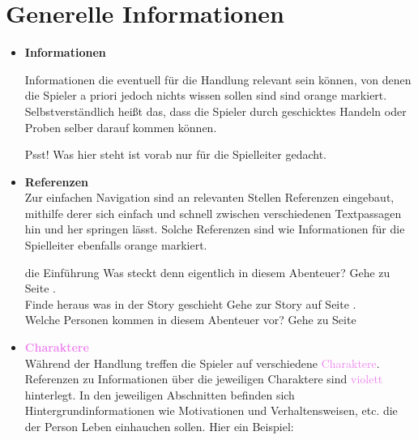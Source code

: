 
\thispagestyle{fancy-info}
\section*{Generelle Informationen}

\begin{itemize}
  \item \textcolor{OrangeBoxFrame}{\textbf{Informationen}}

  Informationen die eventuell für die Handlung relevant sein können, von denen die Spieler a priori jedoch nichts wissen sollen sind sind \textcolor{OrangeBoxFrame}{orange}
  markiert. Selbstverständlich heißt das, dass die Spieler durch geschicktes Handeln oder Proben selber darauf kommen können.

  \begin{info-box}

  Psst! Was hier steht ist vorab nur für die Spielleiter gedacht.

  \end{info-box}

  \item \textcolor{OrangeBoxFrame}{\textbf{Referenzen}} \\
  Zur einfachen Navigation sind an relevanten Stellen \textcolor{OrangeBoxFrame}{Referenzen} eingebaut, mithilfe derer sich einfach und
  schnell zwischen verschiedenen Textpassagen hin und her springen lässt. Solche Referenzen sind wie Informationen für die Spielleiter ebenfalls
  \textcolor{OrangeBoxFrame}{orange} markiert.

  \vspace{-5pt}
  \begin{ref-box}{die Einführung}
      Was steckt denn eigentlich in diesem Abenteuer? \then Gehe zu Seite . \\
      Finde heraus was in der Story geschieht \then Gehe zur Story auf Seite . \\
      Welche Personen kommen in diesem Abenteuer vor? \then Gehe zu Seite 
  \end{ref-box}
  \vspace{-5pt}

  \item \textcolor{violet}{\textbf{Charaktere}} \\
  Während der Handlung treffen die Spieler auf verschiedene \textcolor{violet}{Charaktere}. Referenzen zu Informationen über
  die jeweiligen Charaktere sind \textcolor{violet}{violett} hinterlegt. In den jeweiligen Abschnitten befinden sich
  Hintergrundinformationen wie Motivationen und Verhaltensweisen, etc. die der Person Leben einhauchen sollen. Hier ein
  Beispiel:


\end{itemize}
